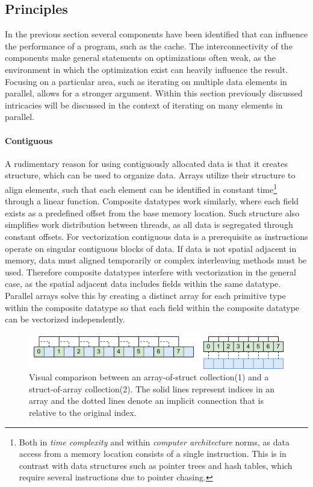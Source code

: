 \documentclass{article}
\begin{document}
\newpage

\subsection{Principles}

In the previous section several components have been identified that can influence the performance of a program, such as the cache.
The interconnectivity of the components make general statements on optimizations often weak, as the environment in which the optimization exist can heavily influence the result.
Focusing on a particular area, such as iterating on multiple data elements in parallel, allows for a stronger argument.
Within this section previously discussed intricacies will be discussed in the context of iterating on many elements in parallel.

\paragraph{Contiguous} 

A rudimentary reason for using contiguously allocated data is that it creates structure, which can be used to organize data.
Arrays utilize their structure to align elements, such that each element can be identified in constant time\footnote{Both in {\it time complexity} and within {\it computer architecture} norms, as data access from a memory location consists of a single instruction. This is in contrast with data structures such as pointer trees and hash tables, which require several instructions due to pointer chasing. } through a linear function.
Composite datatypes work similarly, where each field exists as a predefined offset from the base memory location.
Such structure also simplifies work distribution between threads, as all data is segregated through constant offsets.
For vectorization contiguous data is a prerequisite as instructions operate on singular contiguous blocks of data.
If data is not spatial adjacent in memory, data must aligned temporarily or complex interleaving methods must be used\cite{interleaved-SIMD}.
Therefore composite datatypes interfere with vectorization in the general case, as the spatial adjacent data includes fields within the same datatype.
Parallel arrays solve this by creating a distinct array for each primitive type within the composite datatype so that each field within the composite datatype can be vectorized independently.

\begin{figure}[ht]
    \centering
    \includegraphics[scale=0.082]{soa-aos.png}
    \caption
    {
        Visual comparison between an array-of-struct collection(1) and a struct-of-array collection(2). 
        The solid lines represent indices in an array and the dotted lines denote an implicit connection that is relative to the original index.
    }
\end{figure}
\end{document}
